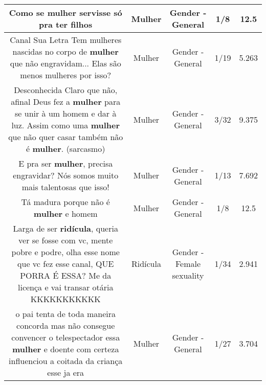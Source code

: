 \documentclass[11pt]{article}
\newlength\mylength
\begin{document}
\begin{center}
\begin{longtable}{|C{.65\mylength}|C{.30\mylength}|C{.12\mylength}|C{.12\mylength}|C{.12\mylength}|}
  \small Como se \textbf{mulher} servisse só pra ter filhos\normalsize   & Mulher & Gender - General & 1/8 & 12.5 \\  \hline
  \small Canal Sua Letra Tem mulheres nascidas no corpo de \textbf{mulher} que não engravidam... Elas são menos mulheres por isso?\normalsize   & Mulher & Gender - General & 1/19 & 5.263 \\  \hline
  \small Desconhecida    Claro que não, afinal Deus fez a \textbf{mulher} para se unir à um homem e dar à luz. Assim como uma \textbf{mulher} que não quer casar também não é \textbf{mulher}. (sarcasmo)\normalsize   & Mulher & Gender - General & 3/32 & 9.375 \\  \hline
  \small E pra ser \textbf{mulher}, precisa engravidar? Nós somos muito mais talentosas que isso!\normalsize   & Mulher & Gender - General & 1/13 & 7.692 \\  \hline
  \small Tá madura porque não é \textbf{mulher} e homem\normalsize   & Mulher & Gender - General & 1/8 & 12.5 \\  \hline
  \small Larga de ser \textbf{ridícula}, queria ver se fosse com vc, mente pobre e podre, olha esse nome que vc fez esse canal, QUE PORRA É ESSA? Me da licença e vai transar otária KKKKKKKKKKK\normalsize   & Ridícula & Gender - Female sexuality & 1/34 & 2.941 \\  \hline
  \small o pai tenta de toda maneira concorda mas não consegue convencer o telespectador essa \textbf{mulher} e doente com certeza influenciou a coitada da criança esse ja era\normalsize   & Mulher & Gender - General & 1/27 & 3.704 \\  \hline

\end{longtable}
\end{center}
\end{document}
